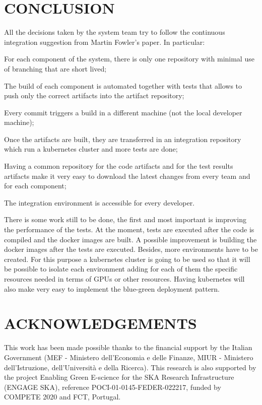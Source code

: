\documentclass[a4paper,
               keeplastbox,   %
               ]{jacow}
\begin{document}
\section{CONCLUSION}
All the decisions taken by the system team try to follow the continuous integration suggestion from Martin Fowler’s paper. In particular: 
\begin{Itemize}
    \item For each component of the system, there is only one repository with minimal use of branching that are short lived;
    \item The build of each component is automated together with tests that allows to push only the correct artifacts into the artifact repository;
    \item Every commit triggers a build in a different machine (not the local developer machine);
    \item Once the artifacts are built, they are transferred in an integration repository which run a kubernetes cluster and more tests are done;
    \item Having a common repository for the code artifacts and for the test results artifacts make it very easy to download the latest changes from every team and for each component;
    \item The integration environment is accessible for every developer. 
\end{Itemize}

There is some work still to be done, the first and most important is improving the performance of the tests. At the moment, tests are executed after the code is compiled and the docker images are built. A possible improvement is building the docker images after the tests are executed. Besides, more environments have to be created. For this purpose a kubernetes cluster is going to be used so that it will be possible to isolate each environment adding for each of them the specific resources needed in terms of GPUs or other resources. Having kubernetes will also make very easy to implement the blue-green deployment pattern.


\section{ACKNOWLEDGEMENTS}
This work has been made possible thanks to the financial support by the Italian Government (MEF - Ministero dell'Economia e delle Finanze, MIUR - Ministero dell'Istruzione, dell'Università e della Ricerca). This research is also supported by the project Enabling Green E-science for the SKA Research Infrastructure (ENGAGE SKA), reference POCI-01-0145-FEDER-022217, funded by COMPETE 2020 and FCT, Portugal.
\end{document}
